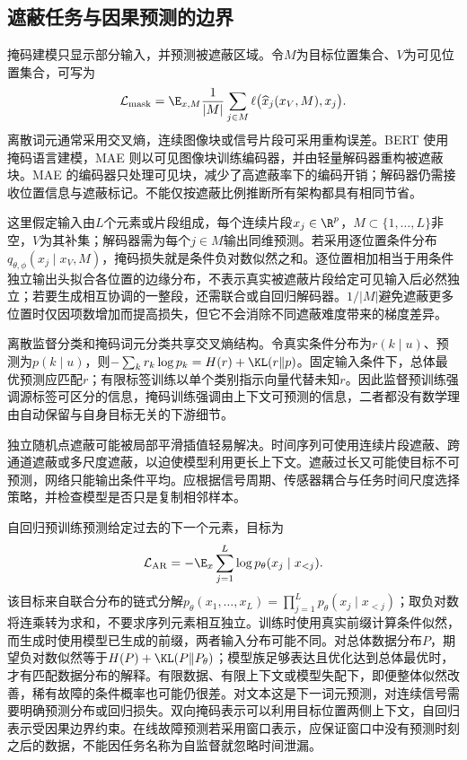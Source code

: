 \subsection{遮蔽任务与因果预测的边界}
掩码建模只显示部分输入，并预测被遮蔽区域。令$M$为目标位置集合、$V$为可见位置集合，可写为
\begin{equation}
 \mathcal L_{\mathrm{mask}}
 =\E_{x,M}\frac1{|M|}\sum_{j\in M}
 \ell\bigl(\widehat x_j(x_V,M),x_j\bigr).
\end{equation}
离散词元通常采用交叉熵，连续图像块或信号片段可采用重构误差。BERT 使用掩码语言建模，MAE 则以可见图像块训练编码器，并由轻量解码器重构被遮蔽块\cite{devlin2019bert,he2022mae}。MAE 的编码器只处理可见块，减少了高遮蔽率下的编码开销；解码器仍需接收位置信息与遮蔽标记。不能仅按遮蔽比例推断所有架构都具有相同节省。

这里假定输入由$L$个元素或片段组成，每个连续片段$x_j\in\R^p$，$M\subset\{1,\ldots,L\}$非空，$V$为其补集；解码器需为每个$j\in M$输出同维预测。若采用逐位置条件分布$q_{\theta,\phi}(x_j\mid x_V,M)$，掩码损失就是条件负对数似然之和。逐位置相加相当于用条件独立输出头拟合各位置的边缘分布，不表示真实被遮蔽片段给定可见输入后必然独立；若要生成相互协调的一整段，还需联合或自回归解码器。$1/|M|$避免遮蔽更多位置时仅因项数增加而提高损失，但它不会消除不同遮蔽难度带来的梯度差异。

离散监督分类和掩码词元分类共享交叉熵结构。令真实条件分布为$r(k\mid u)$、预测为$p(k\mid u)$，则$-\sum_kr_k\log p_k=H(r)+\KL(r\|p)$。固定输入条件下，总体最优预测应匹配$r$；有限标签训练以单个类别指示向量代替未知$r$。因此监督预训练强调源标签可区分的信息，掩码训练强调由上下文可预测的信息，二者都没有数学理由自动保留与自身目标无关的下游细节。

独立随机点遮蔽可能被局部平滑插值轻易解决。时间序列可使用连续片段遮蔽、跨通道遮蔽或多尺度遮蔽，以迫使模型利用更长上下文。遮蔽过长又可能使目标不可预测，网络只能输出条件平均。应根据信号周期、传感器耦合与任务时间尺度选择策略，并检查模型是否只是复制相邻样本。

自回归预训练预测给定过去的下一个元素，目标为
\begin{equation}
 \mathcal L_{\mathrm{AR}}=-\E_x\sum_{j=1}^{L}
 \log p_\theta(x_j\mid x_{<j}).
\end{equation}
该目标来自联合分布的链式分解$p_\theta(x_1,\ldots,x_L)=\prod_{j=1}^Lp_\theta(x_j\mid x_{<j})$；取负对数将连乘转为求和，不要求序列元素相互独立。训练时使用真实前缀计算条件似然，而生成时使用模型已生成的前缀，两者输入分布可能不同。对总体数据分布$P$，期望负对数似然等于$H(P)+\KL(P\|P_\theta)$；模型族足够表达且优化达到总体最优时，才有匹配数据分布的解释。有限数据、有限上下文或模型失配下，即便整体似然改善，稀有故障的条件概率也可能仍很差。对文本这是下一词元预测，对连续信号需要明确预测分布或回归损失。双向掩码表示可以利用目标位置两侧上下文，自回归表示受因果边界约束。在线故障预测若采用窗口表示，应保证窗口中没有预测时刻之后的数据，不能因任务名称为自监督就忽略时间泄漏。

